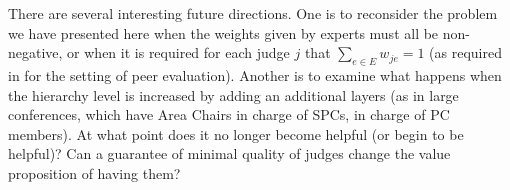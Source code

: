 \documentclass[letterpaper]{article} %
\newtheorem{example}{Example}
\newcommand{\judge}{\ensuremath{j} }
\newcommand{\experts}{\ensuremath{E} }
\newcommand{\expert}{\ensuremath{e} }
\newcommand{\nick}[1]{\todo[color=kentuckyblue!40,size=footnotesize]{Nick says: #1}}
\begin{document}
There are several interesting future directions. One is to reconsider the problem we have presented here when the weights given by experts must all be non-negative, or when it is required for each judge $\judge$ that $\sum_{\expert \in \experts} w_{\judge \expert} = 1$ (as required in \citet{ALMRW16,ALMRW19} for the setting of peer evaluation). Another is to examine what happens when the hierarchy level is increased by adding an additional layers (as in large conferences, which have Area Chairs in charge of SPCs, in charge of PC members). At what point does it no longer become helpful (or begin to be helpful)? Can a guarantee of minimal quality of judges change the value proposition of having them?%





\clearpage
\clearpage


\end{document}
